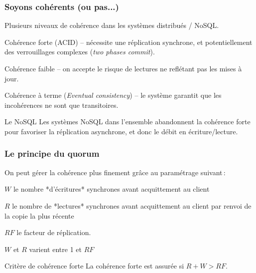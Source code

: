 \begin{frame}
\frametitle{Soyons cohérents (ou pas...)}

Plusieurs niveaux de cohérence dans les systèmes distribués / NoSQL.

\vfill

\begin{redbullet}
  \item \alert{Cohérence forte} (ACID) --  nécessite une réplication synchrone,
     et potentiellement des verrouillages complexes (\textit{two phases commit}).
       
  \item \alert{Cohérence faible} -- on accepte le risque de lectures ne reflétant pas les mises à jour.
  
  \item \alert{Cohérence à terme} (\textit{Eventual consistency}) -- le système
     garantit que les incohérences ne sont que transitoires. 
\end{redbullet}

\begin{remblock}{Le NoSQL}
Les systèmes NoSQL dans l'ensemble abandonnent la cohérence forte pour
favoriser la réplication asynchrone, et donc le débit en écriture/lecture.
\end{remblock}

\end{frame}

\begin{frame}
\frametitle{Le principe du quorum}

On peut gérer la cohérence plus finement grâce au paramétrage suivant\,:

\vfill

\begin{redbullet}
  \item $W$ le nombre *d'écritures* synchrones avant acquittement au client
   
  \item $R$ le nombre de *lectures*  synchrones avant acquittement au client par renvoi de la copie la plus récente

  \item $RF$ le facteur de réplication.
\end{redbullet}

$W$ et $R$ varient entre 1 et $RF$
\vfill

\begin{remblock}{Critère de cohérence forte}
La cohérence forte est assurée si $R + W > RF$.
\end{remblock}

\end{frame}


